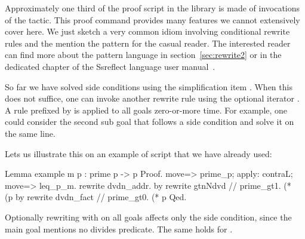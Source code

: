 %
%


\label{sec:rewrite2}

Approximately one third of the proof script in the \mcbMC{} library is made of
invocations of the  tactic. This proof command provides many
features we cannot extensively cover here.  We just sketch a very common idiom
involving conditional rewrite rules and the mention the  pattern for
the casual reader.  The interested reader can find more about the pattern
language in section~\ref{sec:rewrite2} or in the dedicated chapter of
the Ssreflect language user manual~\cite{ssrman}.

So far we have solved side conditions using the simplification item \C{//}.
When this does not suffice, one can invoke another rewrite rule using
the optional iterator .  A rule prefixed by  is applied to
all goals zero-or-more time.  For example, one could consider the
second sub goal that follows  a side condition
and solve it on the same line.

Lets us illustrate this on an example of script that we have already used:

\begin{coq}{}{}
Lemma example m p : prime p -> p %
Proof.
move=> prime_p; apply: contraL; move=> leq_p_m.
rewrite dvdn_addr.
  by rewrite gtnNdvd // prime_gt1. (* ~~ (p %
by rewrite dvdn_fact // prime_gt0. (* p %
Qed.
\end{coq}

Optionally rewriting with  on all goals affects only
the side condition, since the main goal mentions no divides predicate.
The same holds for .

